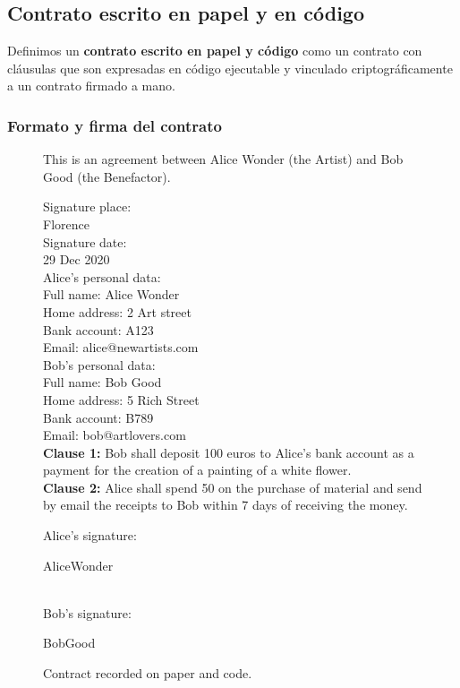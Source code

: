 \documentclass[12pt]{report} %
\begin{document}
\subsection{Contrato escrito en papel y en código}

Definimos un \textbf{contrato escrito en papel y código} como un contrato con cláusulas que son expresadas en código ejecutable y vinculado criptográficamente a un contrato firmado a mano.

\subsubsection{Formato y firma del contrato}


\begin{figure}
\begin{tcolorbox}[width=\textwidth,
   title={This is ...},
   colframe=black!75!white,
   colbacktitle=gray!50!white, coltitle=black,
   colupper=black,    colback=green!5!white]

 This is an agreement between Alice Wonder (the Artist) 
 and Bob Good (the Benefactor). 

\vspace{0.5cm}
Signature place: \\
Florence\\

Signature date:\\ 
29 Dec 2020 \\

Alice's personal data: \\
Full name:  Alice Wonder \\
Home address: 2 Art street \\
Bank account: A123 \\
Email: alice@newartists.com \\


Bob's personal data: \\
Full name: Bob Good \\
Home address: 5 Rich Street \\
Bank account: B789 \\
Email: bob@artlovers.com \\


\textbf{Clause 1:} Bob shall deposit 100 euros to Alice's 
bank account as a payment for the creation of a painting of a 
white flower.\\

\textbf{Clause 2:} Alice shall spend 50 on the purchase of material 
and send by email the receipts to Bob within 7 days of receiving the 
money. 


\vspace{0.5 cm}
Alice's signature: \begin{wedn}AliceWonder\end{wedn} \\

Bob's signature: \begin{wedn}BobGood\end{wedn}

\end{tcolorbox}
\caption{Contract recorded on paper and code.}
\label{box:contpaperandcode}
\end{figure}
\end{document}
